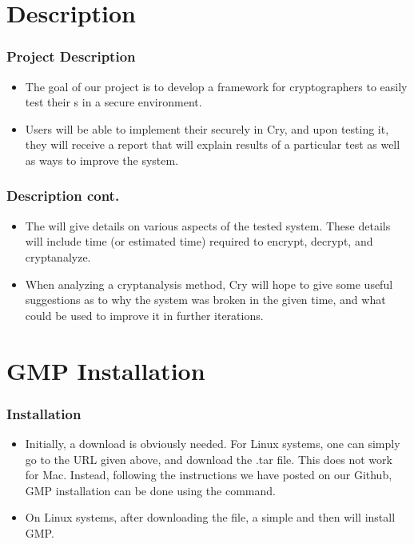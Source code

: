 \section{\cry{} Description}

\begin{frame}
\frametitle{Project Description}
  \begin{itemize}
  \item The goal of our project is to develop a framework for
    cryptographers to easily test their \cs s in a
    secure environment.
  \item Users will be able to implement their
    \cs{} securely in Cry, and upon testing it, they will
    receive a report that will explain results of a particular
    test as well as ways to improve the system.
  \end{itemize}
\end{frame}

\begin{frame}
\frametitle{Description cont.}
  \begin{itemize}
  \item The will give details on various aspects of the tested system.
    These details will include time (or estimated time) required
    to encrypt, decrypt, and cryptanalyze.
  \item When analyzing a
    cryptanalysis method, Cry will hope to give some useful
    suggestions as to why the system was broken in the given
    time, and what could be used to improve it in further
    iterations.
  \end{itemize}
\end{frame}



\section{GMP Installation}

\begin{frame}
\frametitle{Installation}
\begin{itemize}
\item
Initially, a download is obviously needed. For Linux
systems, one can simply go to the URL given above, and
download the .tar file. This does not work for Mac. Instead,
following the instructions we have posted on our Github, GMP
installation can be done using the 
command.
\item
On Linux systems, after downloading the file, a simple
 and then  will install
GMP.
\end{itemize}
\end{frame}

